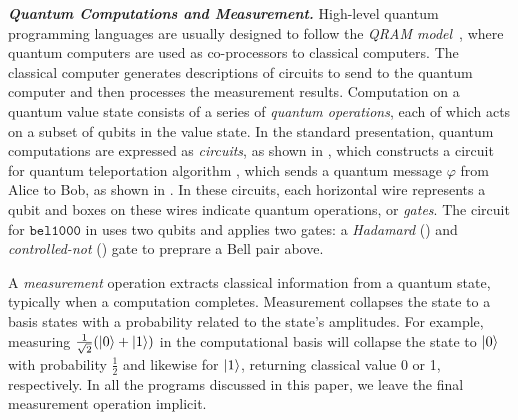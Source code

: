 \noindent\textbf{\textit{Quantum Computations and Measurement.}} High-level quantum programming languages are usually designed to follow the \emph{QRAM model}~\cite{Knill1996}, where quantum computers are used as co-processors to classical computers. The classical computer generates descriptions of circuits to send to the quantum computer and then processes the measurement results.
Computation on a quantum value state consists of a series of \emph{quantum operations}, each of which acts on a subset of qubits in the value state. In the standard presentation, quantum computations are expressed as \emph{circuits}, as shown in , which constructs a circuit for quantum teleportation algorithm \cite{PhysRevLett.70.1895}, which sends a quantum message $\varphi$ from Alice to Bob, as shown in .
In these circuits, each horizontal wire represents a qubit and boxes on these wires indicate quantum operations, or \emph{gates}. The circuit for $\texttt{bel1000}$ in  uses two qubits and applies two gates: a \emph{Hadamard} () and \emph{controlled-not} () gate to preprare a Bell pair above.

A \emph{measurement} operation extracts classical information from a quantum state, typically when a computation completes. Measurement collapses the state to a basis states with a probability related to the state's amplitudes. For example, measuring $\frac{1}{\sqrt{2}}(\ket{0} + \ket{1})$ in the computational basis will collapse the state to $\ket{0}$ with probability $\frac{1}{2}$ and likewise for $\ket{1}$, returning classical value 0 or 1, respectively. In all the programs discussed in this paper, we leave the final measurement operation implicit.


